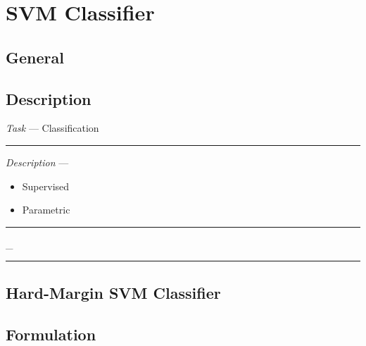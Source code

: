 \section{SVM Classifier}
\subsection*{General}
\subsection*{Description}
\emph{Task} --- Classification

{\color{lightgray}\hrule height 0.001mm}

\emph{Description} --- 
\begin{itemize}
    \item Supervised
    \item Parametric
\end{itemize}

{\color{black}\hrule height 0.001mm}
_
{\color{black}\hrule height 0.001mm}

\subsection*{Hard-Margin SVM Classifier}
\subsection*{Formulation}

